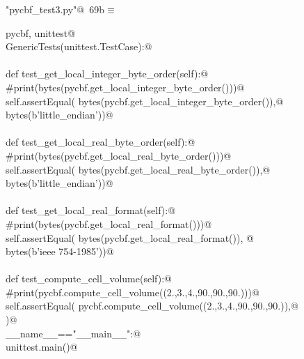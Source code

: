 \documentclass[10pt,a4paper,twoside,notitlepage]{article}
\begin{document}
\begin{flushleft} \small
\begin{minipage}{\linewidth}\label{scrap15}\raggedright\small
{} \verb@"pycbf_test3.py"@\nobreak\ {\footnotesize {69b}}$\equiv$
\vspace{-1ex}
\begin{list}{}{} \item
\mbox{}\verb@import pycbf, unittest@\\
\mbox{}\verb@class GenericTests(unittest.TestCase):@\\
\mbox{}\verb@@\\
\mbox{}\verb@    def test_get_local_integer_byte_order(self):@\\
\mbox{}\verb@        #print(bytes(pycbf.get_local_integer_byte_order()))@\\
\mbox{}\verb@        self.assertEqual( bytes(pycbf.get_local_integer_byte_order()),@\\
\mbox{}\verb@                         bytes(b'little_endian'))@\\
\mbox{}\verb@@\\
\mbox{}\verb@    def test_get_local_real_byte_order(self):@\\
\mbox{}\verb@        #print(bytes(pycbf.get_local_real_byte_order()))@\\
\mbox{}\verb@        self.assertEqual( bytes(pycbf.get_local_real_byte_order()),@\\
\mbox{}\verb@                          bytes(b'little_endian'))@\\
\mbox{}\verb@@\\
\mbox{}\verb@    def test_get_local_real_format(self):@\\
\mbox{}\verb@        #print(bytes(pycbf.get_local_real_format()))@\\
\mbox{}\verb@        self.assertEqual( bytes(pycbf.get_local_real_format()), @\\
\mbox{}\verb@                          bytes(b'ieee 754-1985'))@\\
\mbox{}\verb@@\\
\mbox{}\verb@    def test_compute_cell_volume(self):@\\
\mbox{}\verb@        #print(pycbf.compute_cell_volume((2.,3.,4.,90.,90.,90.)))@\\
\mbox{}\verb@        self.assertEqual( pycbf.compute_cell_volume((2.,3.,4.,90.,90.,90.)),@\\
\mbox{})@\\
\mbox{}\verb@if __name__=="__main__":@\\
\mbox{}\verb@    unittest.main()@\\
\mbox{}\verb@@{\NWsep}
\end{list}
\vspace{-1.5ex}
\footnotesize
\begin{list}{}{\setlength{\itemsep}{-\parsep}\setlength{\itemindent}{-\leftmargin}}

\item{}
\end{list}
\end{minipage}\vspace{4ex}
\end{flushleft}
\end{document}
